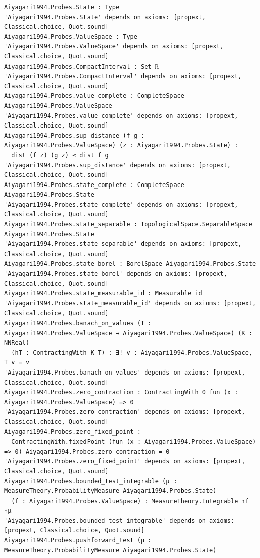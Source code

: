 \documentclass[
  11pt,
]{article}
\begin{document}
\begin{verbatim}
Aiyagari1994.Probes.State : Type
'Aiyagari1994.Probes.State' depends on axioms: [propext, Classical.choice, Quot.sound]
Aiyagari1994.Probes.ValueSpace : Type
'Aiyagari1994.Probes.ValueSpace' depends on axioms: [propext, Classical.choice, Quot.sound]
Aiyagari1994.Probes.CompactInterval : Set ℝ
'Aiyagari1994.Probes.CompactInterval' depends on axioms: [propext, Classical.choice, Quot.sound]
Aiyagari1994.Probes.value_complete : CompleteSpace Aiyagari1994.Probes.ValueSpace
'Aiyagari1994.Probes.value_complete' depends on axioms: [propext, Classical.choice, Quot.sound]
Aiyagari1994.Probes.sup_distance (f g : Aiyagari1994.Probes.ValueSpace) (z : Aiyagari1994.Probes.State) :
  dist (f z) (g z) ≤ dist f g
'Aiyagari1994.Probes.sup_distance' depends on axioms: [propext, Classical.choice, Quot.sound]
Aiyagari1994.Probes.state_complete : CompleteSpace Aiyagari1994.Probes.State
'Aiyagari1994.Probes.state_complete' depends on axioms: [propext, Classical.choice, Quot.sound]
Aiyagari1994.Probes.state_separable : TopologicalSpace.SeparableSpace Aiyagari1994.Probes.State
'Aiyagari1994.Probes.state_separable' depends on axioms: [propext, Classical.choice, Quot.sound]
Aiyagari1994.Probes.state_borel : BorelSpace Aiyagari1994.Probes.State
'Aiyagari1994.Probes.state_borel' depends on axioms: [propext, Classical.choice, Quot.sound]
Aiyagari1994.Probes.state_measurable_id : Measurable id
'Aiyagari1994.Probes.state_measurable_id' depends on axioms: [propext, Classical.choice, Quot.sound]
Aiyagari1994.Probes.banach_on_values (T : Aiyagari1994.Probes.ValueSpace → Aiyagari1994.Probes.ValueSpace) (K : NNReal)
  (hT : ContractingWith K T) : ∃! v : Aiyagari1994.Probes.ValueSpace, T v = v
'Aiyagari1994.Probes.banach_on_values' depends on axioms: [propext, Classical.choice, Quot.sound]
Aiyagari1994.Probes.zero_contraction : ContractingWith 0 fun (x : Aiyagari1994.Probes.ValueSpace) => 0
'Aiyagari1994.Probes.zero_contraction' depends on axioms: [propext, Classical.choice, Quot.sound]
Aiyagari1994.Probes.zero_fixed_point :
  ContractingWith.fixedPoint (fun (x : Aiyagari1994.Probes.ValueSpace) => 0) Aiyagari1994.Probes.zero_contraction = 0
'Aiyagari1994.Probes.zero_fixed_point' depends on axioms: [propext, Classical.choice, Quot.sound]
Aiyagari1994.Probes.bounded_test_integrable (μ : MeasureTheory.ProbabilityMeasure Aiyagari1994.Probes.State)
  (f : Aiyagari1994.Probes.ValueSpace) : MeasureTheory.Integrable ⇑f ↑μ
'Aiyagari1994.Probes.bounded_test_integrable' depends on axioms: [propext, Classical.choice, Quot.sound]
Aiyagari1994.Probes.pushforward_test (μ : MeasureTheory.ProbabilityMeasure Aiyagari1994.Probes.State)

\end{verbatim}
\end{document}
